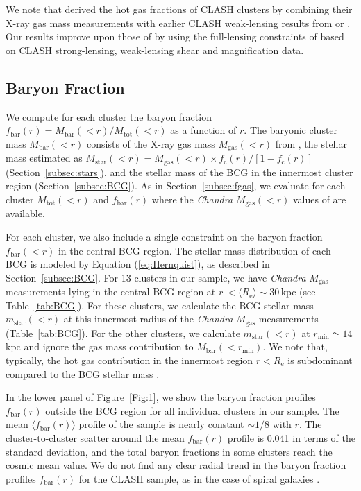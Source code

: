 \documentclass[a4paper,iop,twocolumn,twocolappendix,numberedappendix,appendixfloats]{emulateapj}
\newcommand{\Mtot}{M_\mathrm{tot}}
\newcommand{\Mgas}{M_\mathrm{gas}}
\newcommand{\Mbar}{M_\mathrm{bar}}
\newcommand{\Mstar}{M_\mathrm{star}}
\newcommand{\fbar}{f_\mathrm{bar}}
\newcommand{\fcold}{f_\mathrm{c}}
\begin{document}
We note that \citet{Donahue14} derived the hot gas
fractions of CLASH clusters by combining their X-ray gas mass
measurements with earlier CLASH weak-lensing results from
\citet{Umetsu14} or \citet{Merten15}. Our results improve upon those of
\citet{Donahue14} by using the full-lensing constraints of
\citet{Umetsu16} based on CLASH strong-lensing, weak-lensing shear and
magnification data.

\subsection{Baryon Fraction}
\label{subsec:fbar}

We compute for each cluster the baryon fraction
$\fbar(r)=\Mbar(<r)/\Mtot(<r)$ as a function of $r$.
The baryonic cluster mass $\Mbar(<r)$ consists of the X-ray gas mass
$\Mgas(<r)$ from \citet{Donahue14}, the stellar mass estimated as
$\Mstar(<r) = \Mgas(<r) \times \fcold(r)/[1-\fcold(r)]$
(Section~\ref{subsec:stars}), and the stellar mass of the BCG in the
innermost
cluster region (Section~\ref{subsec:BCG}).  As in
Section~\ref{subsec:fgas}, we evaluate for each cluster $\Mtot(<r)$ and
$\fbar(r)$ where the {\em Chandra} $\Mgas(<r)$ values of
\citet{Donahue14} are available.

For each cluster, we also include a single constraint on the baryon
fraction $\fbar(<r)$ in the central BCG region.
The stellar mass distribution of each BCG is modeled by Equation
(\ref{eq:Hernquist}), as described in Section~\ref{subsec:BCG}.
For 13 clusters in our sample, we have {\em Chandra} $\Mgas$
measurements \citep{Donahue14} lying in the central BCG region at
$r\ < \langle R_\mathrm{e}\rangle\sim 30$\,kpc (see Table~\ref{tab:BCG}).
For these clusters, we calculate the BCG stellar mass
$m_\mathrm{star}(<r)$
at this innermost radius of the {\em Chandra} $\Mgas$ measurements
(Table~\ref{tab:BCG}).
For the other clusters, we calculate $m_\mathrm{star}(<r)$ at
$r_\mathrm{min}\simeq 14$\,kpc and ignore the gas mass contribution to
$\Mbar(<r_\mathrm{min})$.
We note that, typically, the hot gas contribution in the innermost
region $r < R_\mathrm{e}$ is subdominant compared to the BCG stellar
mass \citep[e.g.,][]{Sartoris20}.


In the lower panel of Figure~\ref{Fig:1}, we show the baryon fraction
profiles $\fbar(r)$ outside the BCG region for all individual clusters
in our sample.
The mean $\langle\fbar(r)\rangle$ profile of the sample is nearly
constant $\sim1/8$ \citep{Donahue14} with $r$.
The cluster-to-cluster scatter around the mean $\fbar(r)$ profile is
0.041 in terms of the standard deviation, and the total baryon fractions
in some clusters reach the cosmic mean value.
We do not find any clear radial trend in the baryon fraction profiles
$\fbar(r)$ for the CLASH sample, as in the case of spiral galaxies
\citep{McGaugh04, FM12}.
\end{document}
